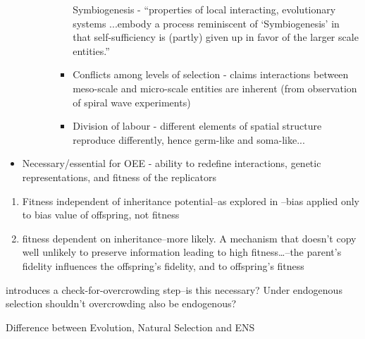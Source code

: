 \begin{itemize}
\begin{itemize}
\begin{itemize}
\begin{itemize}
						Symbiogenesis - ``properties of local interacting, evolutionary
						systems ...embody a process reminiscent of `Symbiogenesis' in
						that self-sufficiency is (partly) given up in favor of the
						larger scale entities.''
						
						\item
						
						Conflicts among levels of selection - claims interactions
						between meso-scale and micro-scale entities are inherent (from
						observation of spiral wave experiments)
						
						\item
						
						Division of labour - different elements of spatial structure
						reproduce differently, hence germ-like and soma-like...
						
					\end{itemize}
				\end{itemize}
			\end{itemize}
			\item
			
			Necessary/essential for OEE - ability to redefine interactions,
			genetic representations, and fitness of the replicators
			
		\end{itemize}


\autocite{Bourrat2015}

\begin{enumerate}
	\item
	Fitness independent of inheritance potential--as explored in
	\autocite{Bourrat2015}--bias applied only to bias value of offspring, not fitness
	\item
	fitness dependent on inheritance--more likely. A mechanism that doesn't copy well unlikely to preserve information leading to high
	fitness\ldots{}--the parent's fidelity influences the offspring's fidelity, and to offspring's fitness
\end{enumerate}


\autocite{Bourrat2015} introduces a check-for-overcrowding step--is this necessary? Under endogenous selection shouldn't overcrowding also be endogenous?


	Difference between Evolution, Natural Selection and ENS
		

